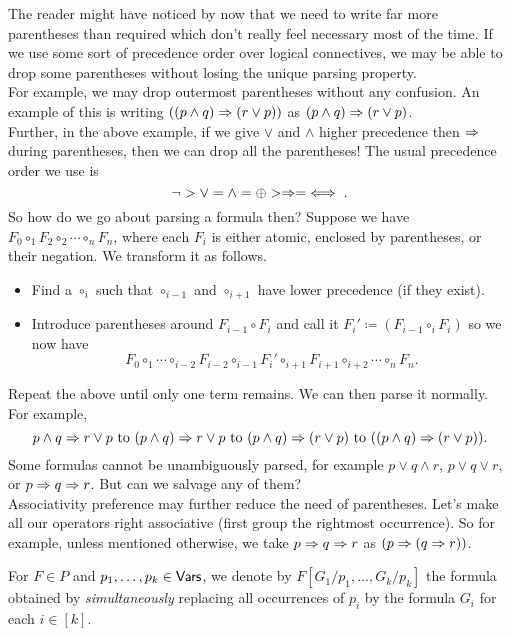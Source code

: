 The reader might have noticed by now that we need to write far more parentheses than required which don't really feel necessary most of the time. If we use some sort of precedence order over logical connectives, we may be able to drop some parentheses without losing the unique parsing property.\\
For example, we may drop outermost parentheses without any confusion. An example of this is writing $((p \wedge q)\Rightarrow (r \vee p))$ as $(p \wedge q)\Rightarrow (r \vee p)$.\\
Further, in the above example, if we give $\vee$ and $\wedge$ higher precedence then $\Rightarrow$ during parentheses, then we can drop all the parentheses! The usual precedence order we use is
\[ \neg > \vee = \wedge = \oplus > \Rightarrow = \iff. \]
So how do we go about parsing a formula then? Suppose we have $F_0\circ_1 F_2\circ_2 \cdots\circ_n F_n$, where each $F_i$ is either atomic, enclosed by parentheses, or their negation. We transform it as follows.
\begin{itemize}
	\item Find a $\circ_i$ such that $\circ_{i-1}$ and $\circ_{i+1}$ have lower precedence (if they exist).
	\item Introduce parentheses around $F_{i-1}\circ F_i$ and call it $F_i'\coloneqq (F_{i-1}\circ_i F_i)$ so we now have
	\[ F_0 \circ_1 \cdots \circ_{i-2} F_{i-2} \circ_{i-1} F_i' \circ_{i+1} F_{i+1} \circ_{i+2} \cdots \circ_n F_n. \]
\end{itemize}
Repeat the above until only one term remains. We can then parse it normally. For example,
\[ p \wedge q \Rightarrow r \vee p \text{ to } (p\wedge q)\Rightarrow r\vee p \text{ to } (p\wedge q)\Rightarrow (r\vee p) \text{ to } ((p\wedge q)\Rightarrow (r\vee p)). \]
Some formulas cannot be unambiguously parsed, for example $p\vee q\wedge r$, $p \vee q \vee r$, or $p\Rightarrow q\Rightarrow r$. But can we salvage any of them?\\
Associativity preference may further reduce the need of parentheses. Let's make all our operators right associative (first group the rightmost occurrence). So for example, unless mentioned otherwise, we take $p\Rightarrow q\Rightarrow r$ as $(p\Rightarrow (q\Rightarrow r))$.

\begin{definition}
For $F\in P$ and $p_1,\ldots,p_k\in\mathsf{Vars}$, we denote by $F[G_1/p_1,\ldots,G_k/p_k]$ the formula obtained by \textit{simultaneously} replacing all occurrences of $p_i$ by the formula $G_i$ for each $i\in[k]$. 
\end{definition}

